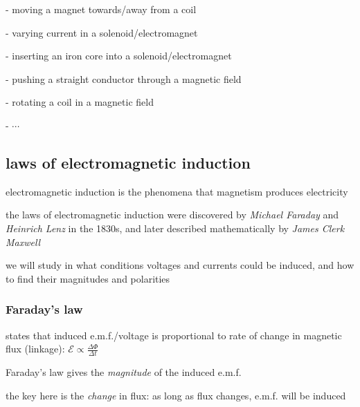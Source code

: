 \begin{compactenum}
	\item[-] moving a magnet towards/away from a coil
	
	\item[-] varying current in a solenoid/electromagnet
	
	\item[-] inserting an iron core into a solenoid/electromagnet
	
	\item[-] pushing a straight conductor through a magnetic field
	
	\item[-] rotating a coil in a magnetic field
	
	\item[-] $\cdots$
\end{compactenum}



\subsection{laws of electromagnetic induction}

electromagnetic induction is the phenomena that magnetism produces electricity

the laws of electromagnetic induction were discovered by \emph{Michael Faraday} and \emph{Heinrich Lenz} in the 1830s, and later described mathematically by \emph{James Clerk Maxwell}

we will study in what conditions voltages and currents could be induced, and how to find their magnitudes and polarities

\subsubsection{Faraday's law}

\rcyskip

\begin{ilight}
	 states that induced e.m.f./voltage is proportional to rate of change in magnetic flux (linkage): $\boxed{\mathcal{E} \propto \frac{\Delta \Phi}{\Delta t}}$
\end{ilight}

\cmt Faraday's law gives the \emph{magnitude} of the induced e.m.f.

the key here is the \emph{change} in flux: as long as flux changes, e.m.f. will be induced


